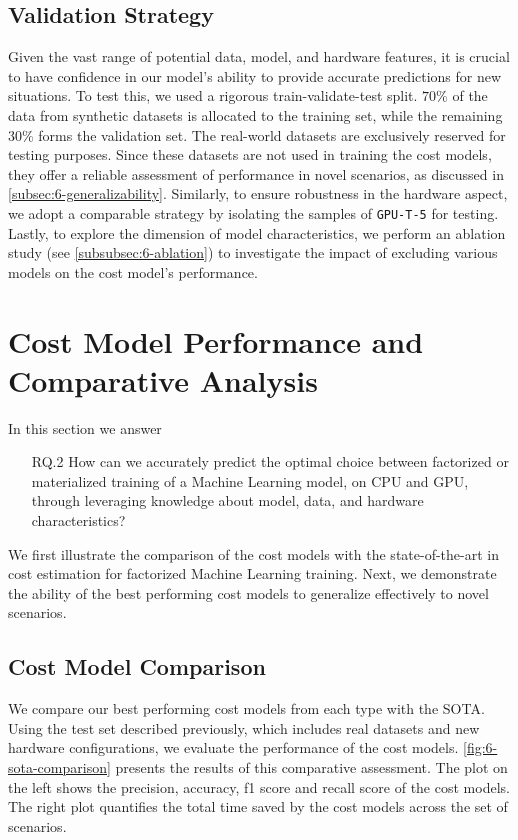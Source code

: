 \subsection{Validation Strategy}
\label{subsec:6-validation-strategy}
Given the vast range of potential data, model, and hardware features, it is crucial to have confidence in our model's ability to provide accurate predictions for new situations. To test this, we used a rigorous train-validate-test split. $70\%$ of the data from synthetic datasets is allocated to the training set, while the remaining $30\%$ forms the validation set. The real-world datasets are exclusively reserved for testing purposes. Since these datasets are not used in training the cost models, they offer a reliable assessment of performance in novel scenarios, as discussed in \autoref{subsec:6-generalizability}. Similarly, to ensure robustness in the hardware aspect, we adopt a comparable strategy by isolating the samples of \texttt{GPU-T-5} for testing. Lastly, to explore the dimension of model characteristics, we perform an ablation study (see \autoref{subsubsec:6-ablation}) to investigate the impact of excluding various models on the cost model's performance.

\section{Cost Model Performance and Comparative Analysis}
\label{sec:eval-model-evaluation}

In this section we answer
\begin{itemize}
  \item[RQ.2] How can we accurately predict the optimal choice between factorized or materialized training of a Machine Learning model, on CPU and GPU, through leveraging knowledge about model, data, and hardware characteristics?
\end{itemize}

We first illustrate the comparison of the cost models with the state-of-the-art in cost estimation for factorized Machine Learning training. Next, we demonstrate the ability of the best performing cost models to generalize effectively to novel scenarios.

\subsection{Cost Model Comparison}
\label{subsec:6-sota-comparison}
We compare our best performing cost models from each type with the SOTA. Using the test set described previously, which includes real datasets and new hardware configurations, we evaluate the performance of the cost models. \autoref{fig:6-sota-comparison} presents the results of this comparative assessment. The plot on the left shows the precision, accuracy, f1 score and recall score of the cost models. The right plot quantifies the total time saved by the cost models across the set of scenarios.

